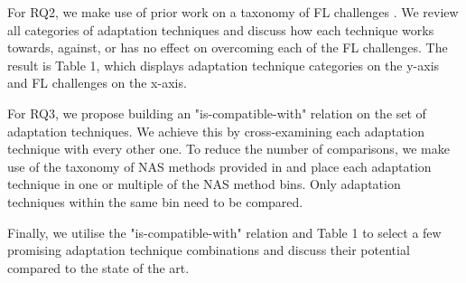 For RQ2, we make use of prior work on a taxonomy of FL challenges \cite{fl_taxonomy_2024}. We review all categories of adaptation techniques and discuss how each technique works towards, against, or has no effect on overcoming each of the FL challenges. The result is Table 1, which displays adaptation technique categories on the y-axis and FL challenges on the x-axis.

For RQ3, we propose building an "is-compatible-with" relation on the set of adaptation techniques. We achieve this by cross-examining each adaptation technique with every other one. To reduce the number of comparisons, we make use of the taxonomy of NAS methods provided in \cite{nas_1000_papers_2023} and place each adaptation technique in one or multiple of the NAS method bins. Only adaptation techniques within the same bin need to be compared.

Finally, we utilise the "is-compatible-with" relation and Table 1 to select a few promising adaptation technique combinations and discuss their potential compared to the state of the art.

